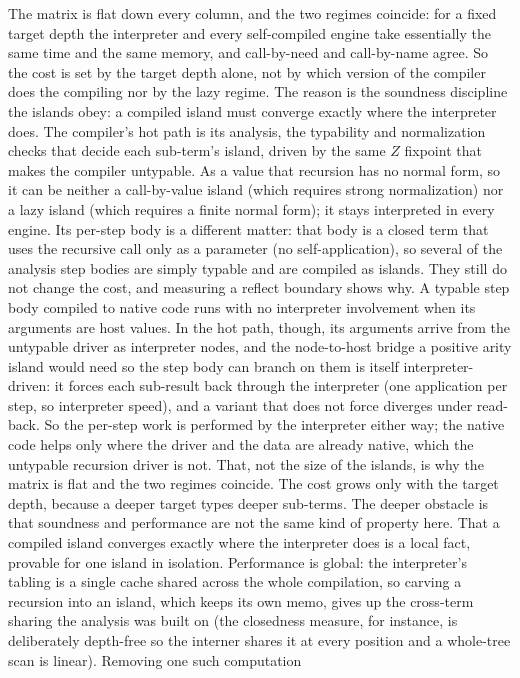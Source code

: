 The matrix is flat down every column, and the two regimes coincide: for a fixed target depth the
interpreter and every self-compiled engine take essentially the same time and the same memory, and
call-by-need and call-by-name agree. So the cost is set by the target depth alone, not by which version
of the compiler does the compiling nor by the lazy regime. The reason is the soundness discipline the
islands obey: a compiled island must converge exactly where the interpreter does. The compiler's hot path
is its analysis, the typability and normalization checks that decide each sub-term's island, driven by
the same $Z$ fixpoint that makes the compiler untypable. As a value that recursion has no normal form, so
it can be neither a call-by-value island (which requires strong normalization) nor a lazy island (which
requires a finite normal form); it stays interpreted in every engine. Its per-step body is a different
matter: that body is a closed term that uses the recursive call only as a parameter (no self-application),
so several of the analysis step bodies are simply typable and are compiled as islands. They still do not
change the cost, and measuring a reflect boundary shows why. A typable step body compiled to native code
runs with no interpreter involvement when its arguments are host values. In the hot path, though, its
arguments arrive from the untypable driver as interpreter nodes, and the node-to-host bridge a positive
arity island would need so the step body can branch on them is itself interpreter-driven: it forces each
sub-result back through the interpreter (one application per step, so interpreter speed), and a variant
that does not force diverges under read-back. So the per-step work is performed by the interpreter either
way; the native code helps only where the driver and the data are already native, which the untypable
recursion driver is not. That, not the size of the islands, is why the matrix is flat and the two regimes
coincide. The cost grows only with the target depth, because a deeper target types deeper sub-terms.
The deeper obstacle is that soundness and performance are not the same kind of property here. That a
compiled island converges exactly where the interpreter does is a local fact, provable for one island in
isolation. Performance is global: the interpreter's tabling is a single cache shared across the whole
compilation, so carving a recursion into an island, which keeps its own memo, gives up the cross-term
sharing the analysis was built on (the closedness measure, for instance, is deliberately depth-free so
the interner shares it at every position and a whole-tree scan is linear). Removing one such computation
